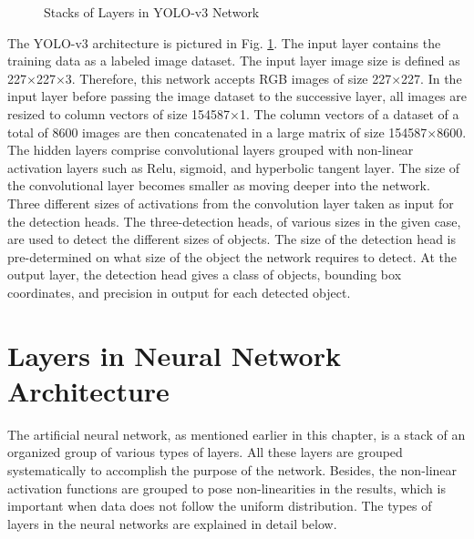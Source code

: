 \begin{figure}
    \centering
    \caption{Stacks of Layers in YOLO-v3 Network \cite{rs12010044}}
    \label{Layers}
\end{figure}

The YOLO-v3 architecture is pictured in Fig. \ref{Layers}. The input layer contains the training data as a labeled image dataset. The input layer image size is defined as 227×227×3. Therefore, this network accepts RGB images of size 227×227. In the input layer before passing the image dataset to the successive layer, all images are resized to column vectors of size 154587×1. The column vectors of a dataset of a total of 8600 images are then concatenated in a large matrix of size 154587×8600. The hidden layers comprise convolutional layers grouped with non-linear activation layers such as Relu, sigmoid, and hyperbolic tangent layer. The size of the convolutional layer becomes smaller as moving deeper into the network. Three different sizes of activations from the convolution layer taken as input for the detection heads. The three-detection heads, of various sizes in the given case, are used to detect the different sizes of objects. The size of the detection head is pre-determined on what size of the object the network requires to detect. At the output layer, the detection head gives a class of objects, bounding box coordinates, and precision in output for each detected object.

\section{Layers in Neural Network Architecture}
The artificial neural network, as mentioned earlier in this chapter, is a stack of an organized group of various types of layers. All these layers are grouped systematically to accomplish the purpose of the network. Besides, the non-linear activation functions are grouped to pose non-linearities in the results, which is important when data does not follow the uniform distribution. The types of layers in the neural networks are explained in detail below. 

